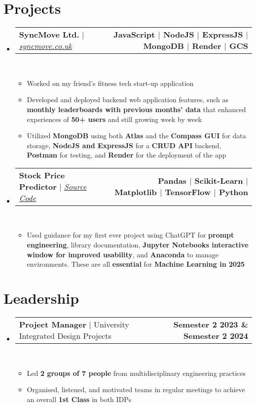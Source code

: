 \documentclass[letterpaper,11pt]{article}
\makeatletter
\newcommand{\resumeItem}[1]{
  \item\small{
    {#1 \vspace{0pt}}
  }
}
\newcommand{\resumeProjectHeading}[2]{
    \item
    \begin{tabular*}{1.001\textwidth}{l@{\extracolsep{\fill}}r}
      \small#1 & \textbf{\small #2}\\
    \end{tabular*}\vspace{-7pt}
}
\newcommand{\resumeSubHeadingListStart}{\begin{itemize}[leftmargin=0.0in, label={}]}
\newcommand{\resumeSubHeadingListEnd}{\end{itemize}}\vspace{0pt}
\newcommand{\resumeItemListStart}{\begin{itemize}}
\newcommand{\resumeItemListEnd}{\end{itemize}\vspace{-5pt}}
\makeatother
\begin{document}
\section{Projects} 
    \vspace{-5pt}
    \resumeSubHeadingListStart
    \resumeProjectHeading
            {\textbf{{SyncMove Ltd.}} $|$ \emph{\href{https://www.syncmove.co.uk/}{syncmove.co.uk}}}{JavaScript $|$ NodeJS $|$ ExpressJS $|$ MongoDB $|$ Render $|$ GCS}
            \\[5mm]
          \resumeItemListStart
            \resumeItem{Worked on my friend's fitness tech start-up application}
            \resumeItem{Developed and deployed backend web application features, such as \textbf{monthly leaderboards with previous months' data} that enhanced experiences of \textbf{50+ users} and still growing week by week}
            \resumeItem{Utilized \textbf{MongoDB} using both \textbf{Atlas} and the \textbf{Compass GUI} for data storage, \textbf{NodeJS and ExpressJS} for a \textbf{CRUD API} backend, \textbf{Postman} for testing, and \textbf{Render} for the deployment of the app}
          \resumeItemListEnd
 \vspace{-20pt}
 \resumeProjectHeading
            {\textbf{{Stock Price Predictor}} $|$ \emph{\href{https://github.com/massengineer/First-Stock-Price-Prediction}{Source Code}}}{Pandas $|$ Scikit-Learn $|$ Matplotlib $|$ TensorFlow $|$ Python}
            \\[5mm]
          \resumeItemListStart
            \resumeItem{Used guidance for my first ever project using ChatGPT for \textbf{prompt engineering}, library documentation, \textbf{Jupyter Notebooks interactive window for improved usability}, and \textbf{Anaconda} to manage environments. These are all \textbf{essential} for \textbf{Machine Learning in 2025}}
          \resumeItemListEnd

\resumeSubHeadingListEnd
\vspace{-28pt}
\section{Leadership} 
    \vspace{-5pt}
    \resumeSubHeadingListStart
                   \resumeProjectHeading
            {\textbf{{Project Manager}} $|$ {University Integrated Design Projects}}{Semester 2 2023 \& Semester 2 2024}
            \\[5mm]
          \resumeItemListStart
            \resumeItem{Led \textbf{2 groups of 7 people} from multidisciplinary engineering practices}
            \resumeItem{Organised, listened, and motivated teams in regular meetings to achieve an overall \textbf{1st Class} in both IDPs}
          \resumeItemListEnd
          \resumeSubHeadingListEnd
 \vspace{-12pt}
\end{document}
